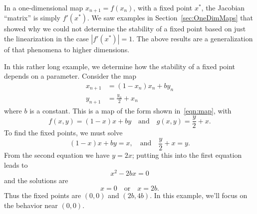 In a one-dimensional map $x_{n+1} = f(x_n)$, with a fixed
point $x^*$, the 
Jacobian ``matrix'' is simply $f'(x^*)$.  We saw examples
in Section~\ref{sec:OneDimMaps} that showed why we could not determine
the stability of a fixed point based on just the linearization
in the case $|f'(x^*)|=1$.  The above results are a generalization
of that phenomena to higher dimensions.


\begin{xexample}
In this rather long example, we determine
how the stability of a fixed point depends on a parameter.
Consider the map
\begin{equation}
\begin{split}
  x_{n+1} & = (1- x_n)x_n + b y_n \\
  y_{n+1} & = \frac{y_n}{2} + x_n
\end{split}
\label{eqn:linearizationexample}
\end{equation}
where $b$ is a constant.
This is a map of the form shown in~\eqref{eqn:map}, with
\begin{equation}
   f(x,y) = (1-x)x+by \quad \textrm{and} \quad g(x,y) = \frac{y}{2}+x.
\end{equation}
To find the fixed points, we must solve
\begin{equation}
   (1 - x)x + by = x, \quad \textrm{and} \quad \frac{y}{2}+x = y.
\end{equation}
From the second equation we have $y = 2x$; putting this into the first equation
leads to
\begin{equation}
   x^2-2bx = 0
\end{equation}
and the solutions are
\begin{equation}
  x = 0 \quad \textrm{or} \quad x= 2b.
\end{equation}
Thus the fixed points are
$(0,0)$ and $(2b,4b)$.
In this example, we'll focus on the behavior near $(0,0)$.


\end{xexample}
